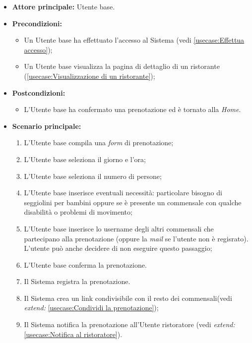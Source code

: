 \label{usecase:Prenotazione di un tavolo}
\begin{itemize}
	\item \textbf{Attore principale:} Utente base.
	\item \textbf{Precondizioni:}
		\begin{itemize}
			\item Un Utente base ha effettuato l'accesso al Sistema (vedi \autoref{usecase:Effettua accesso});
			\item Un Utente base visualizza la pagina di dettaglio di un ristorante (\autoref{usecase:Visualizzazione di un ristorante});
		\end{itemize}
	\item \textbf{Postcondizioni:}
		\begin{itemize}
			\item L'Utente base ha confermato una prenotazione ed è tornato alla \textit{Home}.
		\end{itemize} 
	      
	\item \textbf{Scenario principale:}
	      \begin{enumerate}
		      \item L'Utente base compila una \textit{form} di prenotazione;
		      \item L'Utente base seleziona il giorno e l'ora;
		      \item L'Utente base seleziona il numero di persone;
		      \item L'Utente base inserisce eventuali necessità: particolare bisogno di seggiolini per bambini oppure se è presente un commensale con qualche disabilità o problemi di movimento;
		      \item L'Utente base inserisce lo username degli altri commensali che partecipano alla prenotazione (oppure la \textit{mail} se l'utente non è regisrato).
			  L'utente può anche decidere di non eseguire questo passaggio;
		      \item L'Utente base conferma la prenotazione.
		      \item Il Sistema registra la prenotazione.
		      \item Il Sistema crea un link condivisibile con il resto dei commensali(vedi \textit{extend:} \autoref{usecase:Condividi la prenotazione});
		      \item Il Sistema notifica la prenotazione all'Utente ristoratore (vedi \textit{extend:} \autoref{usecase:Notifica al ristoratore}).
	      \end{enumerate}


\end{itemize}
